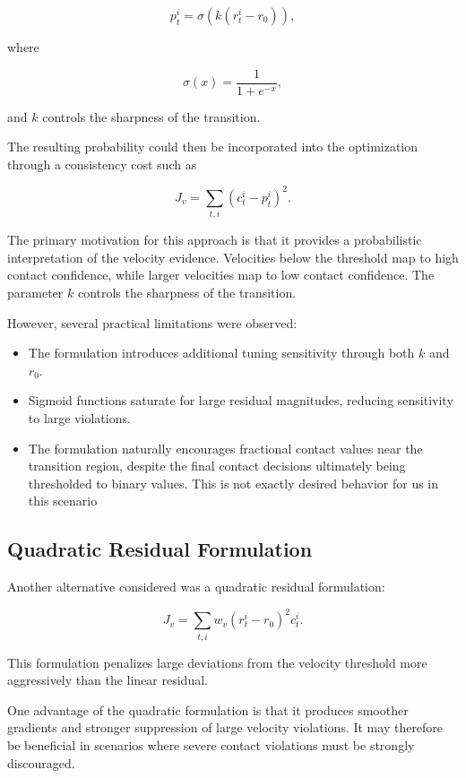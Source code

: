 \documentclass[conference]{IEEEtran}
\begin{document}
\[
p_t^i
=
\sigma\left(k(r_t^i-r_0)\right),
\]

where

\[
\sigma(x)
=
\frac{1}{1+e^{-x}},
\]

and $k$ controls the sharpness of the transition.

The resulting probability could then be incorporated into the optimization through a consistency cost such as

\[
J_v
=
\sum_{t,i}
\left(c_t^i - p_t^i\right)^2.
\]


The primary motivation for this approach is that it provides a probabilistic interpretation of the velocity evidence. Velocities below the threshold map to high contact confidence, while larger velocities map to low contact confidence. The parameter $k$ controls the sharpness of the transition.

However, several practical limitations were observed:

\begin{itemize}
    \item The formulation introduces additional tuning sensitivity through both $k$ and $r_0$.
    
    \item Sigmoid functions saturate for large residual magnitudes, reducing sensitivity to large violations.
    
    \item The formulation naturally encourages fractional contact values near the transition region, despite the final contact decisions ultimately being thresholded to binary values. This is not exactly desired behavior 
    for us in this scenario
\end{itemize}

\subsection{Quadratic Residual Formulation}

Another alternative considered was a quadratic residual formulation:

\[
J_v
=
\sum_{t,i}
w_v
\left(r_t^i-r_0\right)^2
c_t^i.
\]

This formulation penalizes large deviations from the velocity threshold more aggressively than the linear residual.

One advantage of the quadratic formulation is that it produces smoother gradients and stronger suppression of large velocity violations. It may therefore be beneficial in scenarios where severe contact violations must be strongly discouraged.
\end{document}
